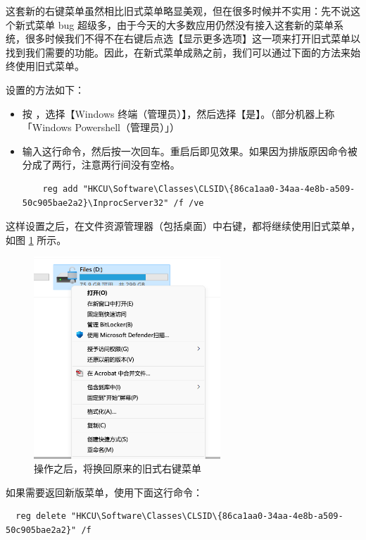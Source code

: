这套新的右键菜单虽然相比旧式菜单略显美观，但在很多时候并不实用：先不说这个新式菜单 bug 超级多，由于今天的大多数应用仍然没有接入这套新的菜单系统，很多时候我们不得不在右键后点选【显示更多选项】这一项来打开旧式菜单以找到我们需要的功能。因此，在新式菜单成熟之前，我们可以通过下面的方法来始终使用旧式菜单。

设置的方法如下：

\begin{itemize}
  \item 按 ，选择【Windows 终端（管理员）】，然后选择【是】。（部分机器上称「Windows Powershell（管理员）」）
  \item 输入这行命令，然后按一次回车。重启后即见效果。如果因为排版原因命令被分成了两行，注意两行间没有空格。
  \begin{lstlisting}
    reg add "HKCU\Software\Classes\CLSID\{86ca1aa0-34aa-4e8b-a509-50c905bae2a2}\InprocServer32" /f /ve
  \end{lstlisting}
\end{itemize}

这样设置之后，在文件资源管理器（包括桌面）中右键，都将继续使用旧式菜单，如图 \ref{Old_menu} 所示。

\begin{figure}[htb!]
  \centering
  \includegraphics[width=7cm]{assets/Old_menu.png}
  \caption{操作之后，将换回原来的旧式右键菜单}
  \label{Old_menu}
\end{figure}

如果需要返回新版菜单，使用下面这行命令：

\begin{lstlisting}
  reg delete "HKCU\Software\Classes\CLSID\{86ca1aa0-34aa-4e8b-a509-50c905bae2a2}" /f
\end{lstlisting}
